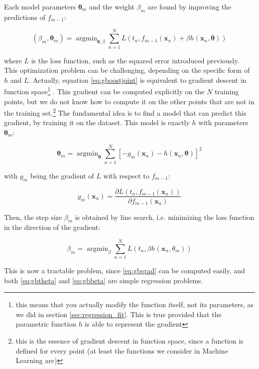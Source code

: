 \documentclass[a4paper,11pt]{kth-mag}
\DeclareMathOperator*{\argmin}{argmin}
\begin{document}
Each model parameters $\bm\theta_m$ and the weight $\beta_m$ are found by improving the predictions of $f_{m-1}$:

\begin{equation}
\label{eq:gboostjoint}
(\beta_m, \bm\theta_m)=\argmin_{\bm\theta,\beta}\sum_{n=1}^N L\left(
t_n, f_{m-1}(\bm x_n)+\beta h(\bm x_n,\bm\theta)
\right)
\end{equation}

\noindent where $L$ is the loss function, such as the squared error introduced previously. This optimization problem can be challenging, depending on the specific form of $h$ and $L$. Actually, equation \ref{eq:gboostjoint} is equivalent to gradient descent in function space\footnote{this means that you actually modify the function itself, not its parameters, as we did in section \ref{sec:regression_fit}. This is true provided that the parametric function $h$ is able to represent the gradient} \citep{boostinggd,greedyboosting}. This gradient can be computed explicitly on the $N$ training points, but we do not know how to compute it on the other points that are not in the training set.\footnote{this is the essence of gradient descent in function space, since a function is defined for every point (at least the functions we consider in Machine Learning are)} The fundamental idea is to find a model that can predict this gradient, by training it on the dataset. This model is exactly $h$ with parameters $\bm\theta_m$:

\begin{equation}
\label{eq:gbtheta}
\bm\theta_m=\argmin_{\bm\theta}\sum_{n=1}^N \left[
-g_m(\bm x_n)-h(\bm x_n,\bm\theta)
\right]^2
\end{equation}

\noindent with $g_m$ being the gradient of $L$ with respect to $f_{m-1}$:

\begin{equation}
\label{eq:gbgrad}
g_m(\bm x_n)=\frac{\partial L(t_n,f_{m-1}(\bm x_n))}{\partial f_{m-1}(\bm x_n)}
\end{equation}

Then, the step size $\beta_m$ is obtained by line search, i.e. minimizing the loss function in the direction of the gradient:

\begin{equation}
\label{eq:gbbeta}
\beta_m=\argmin_{\beta}\sum_{n=1}^N L(t_n, \beta h(\bm x_n,\theta_m))
\end{equation}

This is now a tractable problem, since \ref{eq:gbgrad} can be computed easily, and both \ref{eq:gbtheta} and \ref{eq:gbbeta} are simple regression problems.
\end{document}
